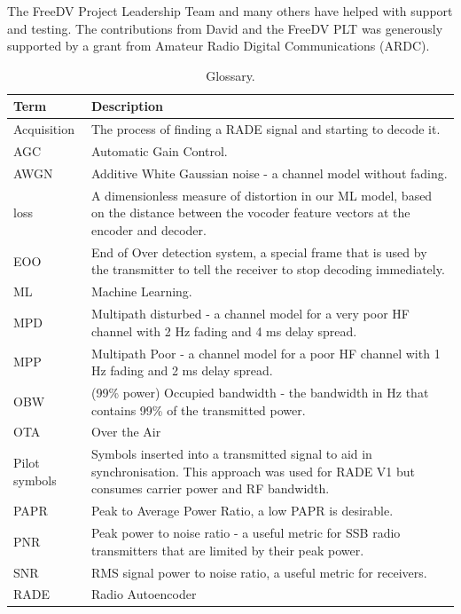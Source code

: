 \documentclass{article}
\begin{document}
The FreeDV Project Leadership Team and many others have helped with support and testing. The contributions from David and the FreeDV PLT was generously supported by a grant from Amateur Radio Digital Communications (ARDC).

\begin{table} [h]
\caption{Glossary.}
\label{tab:glossary}
\centering
\begin{tabular}{ p{2.5cm} | p{10cm} }
 \hline
  Term & Description \\
 \hline
  Acquisition & The process of finding a RADE signal and starting to decode it. \\
  AGC & Automatic Gain Control. \\
  AWGN & Additive White Gaussian noise - a channel model without fading. \\
  loss & A dimensionless measure of distortion in our ML model, based on the distance between the vocoder feature vectors at the encoder and decoder. \\
  EOO & End of Over detection system, a special frame that is used by the transmitter to tell the receiver to stop decoding immediately. \\
  ML & Machine Learning. \\
  MPD & Multipath disturbed - a channel model for a very poor HF channel with 2 \si{Hz} fading and 4 \si{ms} delay spread. \\
  MPP & Multipath Poor - a channel model for a poor HF channel with 1 \si{Hz} fading and 2 \si{ms} delay spread. \\
  OBW & (99\% power) Occupied bandwidth - the bandwidth in \si{Hz} that contains 99\% of the transmitted power. \\
  OTA & Over the Air \\
  Pilot symbols & Symbols inserted into a transmitted signal to aid in synchronisation. This approach was used for RADE V1 but consumes carrier power and RF bandwidth. \\
  PAPR & Peak to Average Power Ratio, a low PAPR is desirable. \\
  PNR & Peak power to noise ratio - a useful metric for SSB radio transmitters that are limited by their peak power. \\
  SNR & RMS signal power to noise ratio, a useful metric for receivers. \\
  RADE & Radio Autoencoder \\
 \hline
\end{tabular}
\end{table}
\end{document}
